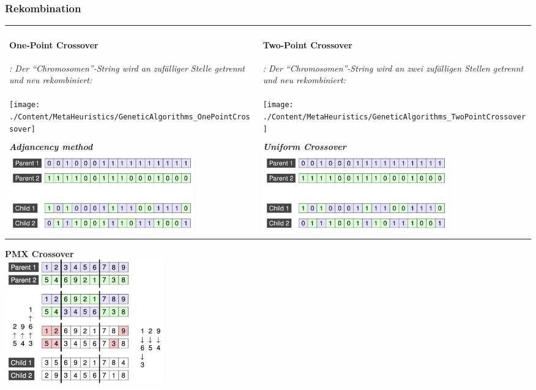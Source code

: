 \subsubsection{Rekombination }
  \begin{tabularx}{\textwidth}{p{9cm} p{9cm}}
    \em \paragraph{One-Point Crossover}\em : Der "`Chromosomen"'-String wird an zufälliger Stelle getrennt und neu rekombiniert: 
      & \em \paragraph{Two-Point Crossover}\em : Der "`Chromosomen"'-String wird an zwei zufälligen Stellen getrennt und neu rekombiniert: \\
    \texttt{[image: ./Content/MetaHeuristics/GeneticAlgorithms\_OnePointCrossover]}
      & \texttt{[image: ./Content/MetaHeuristics/GeneticAlgorithms\_TwoPointCrossover]} \\ \\
    \em \textbf{Adjancency method}\em
      & \em \textbf{Uniform Crossover}\\
      \includegraphics[width=8cm]{./Content/MetaHeuristics/uniform_crossover}
      & \includegraphics[width=8cm]{./Content/MetaHeuristics/uniform_crossover}\\
  
      
  \end{tabularx}

 \newpage
\textbf{PMX Crossover}\\
\includegraphics[width=0.3\textwidth]{./Content/MetaHeuristics/pmx_crossover}\\


